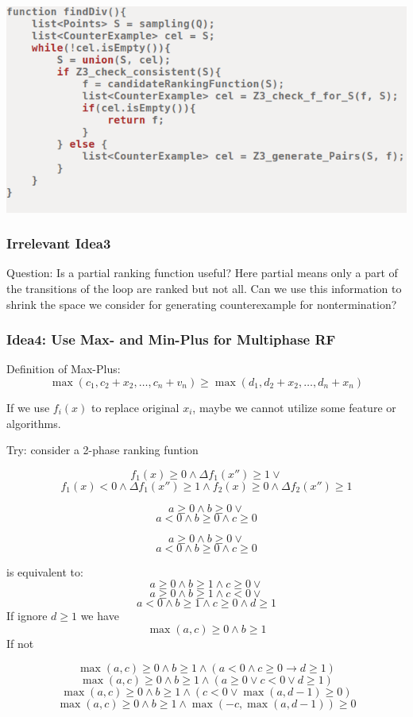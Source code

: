 \documentclass[10pt]{beamer}
\begin{document}
\begin{frame}
\begin{center}
\includegraphics[scale=0.5]{1.png}
\end{center}
\end{frame}


\begin{frame}\frametitle{Irrelevant Idea3}
Question: Is a partial ranking function useful? Here partial means only a part of the transitions of the loop are ranked but not all. Can we use this information to shrink the space we consider for generating counterexample for nontermination?



\end{frame}

\begin{frame}\frametitle{Idea4: Use Max- and Min-Plus for Multiphase RF}
Definition of Max-Plus:
\[\max(c_1, c_2 + x_2, \ldots, c_n + v_n) \ge \max(d_1, d_2 + x_2, \ldots, d_n + x_n)\]

If we use $f_i(x)$ to replace original $x_i$, maybe we cannot utilize some feature or algorithms.

Try: consider a 2-phase ranking funtion

\[f_1(x) \ge 0 \wedge \Delta f_1(x'') \ge 1 \vee\]
\[ f_1(x) < 0 
\wedge \Delta f_1(x'') \ge 1 \wedge f_2(x) \ge 0 \wedge \Delta f_2(x'') \ge 1\]


\[a \ge 0 \wedge b \ge 0 \vee\]
\[a  < 0 \wedge b \ge 0 \wedge c \ge 0 \]


\end{frame}

\begin{frame}

\[a \ge 0 \wedge b \ge 0 \vee\]
\[a  < 0 \wedge b \ge 0 \wedge c \ge 0 \]

is equivalent to:
\[a \ge 0 \wedge b \ge 1 \wedge c \ge 0  \vee\]
\[a \ge 0 \wedge b \ge 1 \wedge c < 0  \vee\]
\[a  < 0 \wedge b \ge 1 \wedge c \ge 0 \wedge d \ge 1\]
If ignore $d \ge 1 $ we have
\[\max(a, c) \ge 0 \wedge b\ge 1\]
If not 


\[\max(a, c) \ge 0 \wedge b\ge 1 \wedge (a < 0 \wedge c \ge 0 \rightarrow d \ge 1 )\]
\[\max(a,c)\ge 0 \wedge b \ge 1 \wedge (a \ge 0 \vee c < 0 \vee d \ge 1 )\]
\[\max(a,c)\ge 0 \wedge b \ge 1 \wedge ( c < 0 \vee \max(a, d-1)\ge 0)\]
\[\max(a,c)\ge 0 \wedge b \ge 1 \wedge  \max(-c, \max(a, d-1))\ge 0\]
\end{frame}
\end{document}
